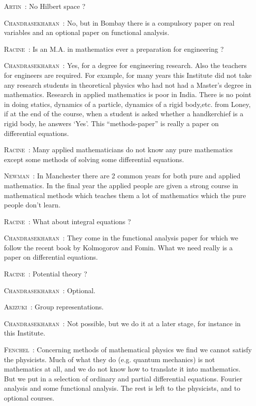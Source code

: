 \smallskip
\noindent
\textsc{Artin}~: No Hilbert space ?

\smallskip
\noindent
\textsc{Chandrasekharan}~: No, but in Bombay there is a compulsory paper on real variables and an optional paper on functional analysis. 

\smallskip
\noindent
\textsc{Racine}~: Is an M.A. in mathematics ever a preparation for engineering ?

\smallskip
\noindent
\textsc{Chandrasekharan}~: Yes, for a degree for engineering research. Also the teachers for engineers are required. For example, for many years this Institute did not take any research students in theoretical physics who had not had a Master's degree in mathematics. Research in applied mathematics is poor in India. There is no point in doing statics, dynamics of a particle, dynamics of a rigid body,\pageoriginale etc. from Loney, if at the end of the course, when a student is asked whether a handkerchief is a rigid body, he answers `Yes'. This ``methods-paper'' is really a paper on differential equations.

\smallskip
\noindent
\textsc{Racine}~: Many applied mathematicians do not know any pure mathematics except some methods of solving some differential equations.

\smallskip
\noindent
\textsc{Newman}~: In Manchester there are 2 common years for both pure and applied mathematics. In the final year the applied people are given a strong course in mathematical methods which teaches them a lot of mathematics which the pure people don't learn.

\smallskip
\noindent
\textsc{Racine}~: What about integral equations ?

\smallskip
\noindent
\textsc{Chandrasekharan}~: They come in the functional analysis paper for which we follow the recent book by Kolmogorov and Fomin. What we need really is a paper on differential equations.

\smallskip
\noindent
\textsc{Racine}~: Potential theory ?

\smallskip
\noindent
\textsc{Chandrasekharan}~: Optional.

\smallskip
\noindent
\textsc{Akizuki}~: Group representations.

\smallskip
\noindent
\textsc{Chandrasekharan}~: Not possible, but we do it at a later stage, for instance in this Institute.

\smallskip
\noindent
\textsc{Fenchel}~: Concerning methods of mathematical physics we find we cannot satisfy the physicists. Much of what they do (e.g. quantum mechanics) is not mathematics at all, and we do not know how to translate it into mathematics. But we put in a selection of ordinary and partial differential equations. Fourier analysis and some functional analysis. The rest is left to the physicists, and to optional courses.

